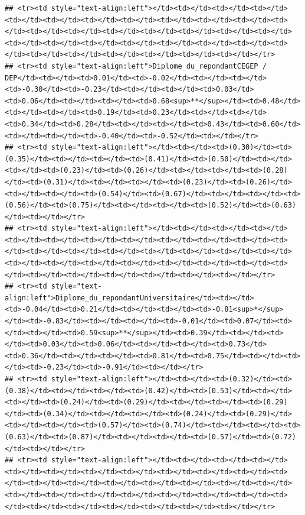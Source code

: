 \documentclass[
]{article}
\begin{document}
\begin{verbatim}
## <tr><td style="text-align:left"></td><td></td><td></td><td></td><td></td><td></td><td></td><td></td><td></td><td></td><td></td><td></td><td></td><td></td><td></td><td></td><td></td><td></td><td></td><td></td><td></td><td></td><td></td><td></td><td></td><td></td><td></td><td></td><td></td><td></td><td></td><td></td><td></td></tr>
## <tr><td style="text-align:left">Diplome_du_repondantCEGEP / DEP</td><td></td><td>0.01</td><td>-0.02</td><td></td><td></td><td>-0.30</td><td>-0.23</td><td></td><td></td><td>0.03</td><td>0.06</td><td></td><td></td><td>0.68<sup>**</sup></td><td>0.48</td><td></td><td></td><td>0.19</td><td>0.23</td><td></td><td></td><td>0.34</td><td>0.28</td><td></td><td></td><td>0.43</td><td>0.60</td><td></td><td></td><td>-0.40</td><td>-0.52</td><td></td></tr>
## <tr><td style="text-align:left"></td><td></td><td>(0.30)</td><td>(0.35)</td><td></td><td></td><td>(0.41)</td><td>(0.50)</td><td></td><td></td><td>(0.23)</td><td>(0.26)</td><td></td><td></td><td>(0.28)</td><td>(0.31)</td><td></td><td></td><td>(0.23)</td><td>(0.26)</td><td></td><td></td><td>(0.54)</td><td>(0.67)</td><td></td><td></td><td>(0.56)</td><td>(0.75)</td><td></td><td></td><td>(0.52)</td><td>(0.63)</td><td></td></tr>
## <tr><td style="text-align:left"></td><td></td><td></td><td></td><td></td><td></td><td></td><td></td><td></td><td></td><td></td><td></td><td></td><td></td><td></td><td></td><td></td><td></td><td></td><td></td><td></td><td></td><td></td><td></td><td></td><td></td><td></td><td></td><td></td><td></td><td></td><td></td><td></td></tr>
## <tr><td style="text-align:left">Diplome_du_repondantUniversitaire</td><td></td><td>-0.04</td><td>0.21</td><td></td><td></td><td>-0.81<sup>*</sup></td><td>-0.83</td><td></td><td></td><td>-0.01</td><td>0.07</td><td></td><td></td><td>0.59<sup>**</sup></td><td>0.39</td><td></td><td></td><td>0.03</td><td>0.06</td><td></td><td></td><td>0.73</td><td>0.36</td><td></td><td></td><td>0.81</td><td>0.75</td><td></td><td></td><td>-0.23</td><td>-0.91</td><td></td></tr>
## <tr><td style="text-align:left"></td><td></td><td>(0.32)</td><td>(0.38)</td><td></td><td></td><td>(0.42)</td><td>(0.53)</td><td></td><td></td><td>(0.24)</td><td>(0.29)</td><td></td><td></td><td>(0.29)</td><td>(0.34)</td><td></td><td></td><td>(0.24)</td><td>(0.29)</td><td></td><td></td><td>(0.57)</td><td>(0.74)</td><td></td><td></td><td>(0.63)</td><td>(0.87)</td><td></td><td></td><td>(0.57)</td><td>(0.72)</td><td></td></tr>
## <tr><td style="text-align:left"></td><td></td><td></td><td></td><td></td><td></td><td></td><td></td><td></td><td></td><td></td><td></td><td></td><td></td><td></td><td></td><td></td><td></td><td></td><td></td><td></td><td></td><td></td><td></td><td></td><td></td><td></td><td></td><td></td><td></td><td></td><td></td><td></td></tr>

\end{verbatim}
\end{document}
